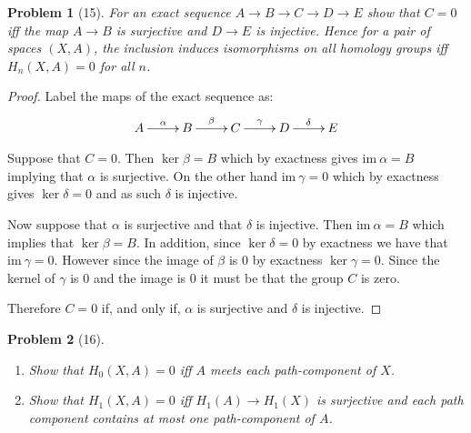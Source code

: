 \documentclass[10pt]{article}
\newcommand{\sk}{\vskip 10mm}
\newcommand{\ima}{\mathrm{im}\ }
\theoremstyle{plain}
\newtheorem{problem}{Problem}
\theoremstyle{remark}
\begin{document}
\begin{problem}[15]
  For an exact sequence $A\rightarrow B\rightarrow C\rightarrow D\rightarrow E$ show that $C=0$ iff
  the map $A\rightarrow B$ is surjective and $D\rightarrow E$ is injective. Hence
  for a pair of spaces $(X,A)$, the inclusion induces isomorphisms
  on all homology groups iff $H_n(X,A)=0$ for all $n$.
\end{problem}

\begin{proof}
  Label the maps of the exact sequence as:
  \[
    \xymatrix{A \ar[r]^\alpha & B \ar[r]^\beta & C \ar[r]^\gamma & D \ar[r]^\delta & E}
  \]
  
  Suppose that $C=0$. Then $\ker \beta= B$ which by exactness gives
  $\ima \alpha= B$ implying that $\alpha$ is surjective. On the other hand
  $\ima \gamma=0$ which by exactness gives $\ker \delta=0$ and as such
  $\delta$ is injective.

  Now suppose that $\alpha$ is surjective and that $\delta$ is injective. Then
  $\ima \alpha = B$ which implies that $\ker \beta=B$. In addition, since
  $\ker\delta=0$ by exactness we have that $\ima \gamma=0$. However since
  the image of $\beta$ is $0$ by exactness $\ker \gamma=0$. Since the
  kernel of $\gamma$ is 0 and the image is 0 it must be that the group
  $C$ is zero.

  Therefore $C=0$ if, and only if, $\alpha$ is surjective and $\delta$ is
  injective.
\end{proof}

\sk

\begin{problem}[16]
  \begin{enumerate}
  \item[(a)] Show that $H_0(X,A)=0$ iff $A$ meets each path-component
    of $X$.
  \item[(b)] Show that $H_1(X,A)=0$ iff $H_1(A)\rightarrow H_1(X)$ is surjective and
    each path component contains at most one path-component of $A$.
  \end{enumerate}
\end{problem}
\end{document}
